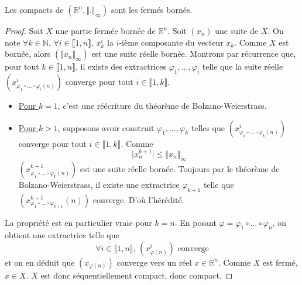 





  \begin{lemma}
    \label{equivalence-des-normes-en-dimension-finie-et-theoreme-de-riesz-1}
    Les compacts de $(\mathbb{R}^n, \Vert . \Vert_\infty)$ sont les fermés bornés.
  \end{lemma}

  \begin{proof}
    Soit $X$ une partie fermée bornée de $\mathbb{R}^n$. Soit $(x_n)$ une suite de $X$. On note $\forall k \in \mathbb{N}$, $\forall i \in \llbracket 1, n \rrbracket$, $x_k^i$ la $i$-ième composante du vecteur $x_k$. Comme $X$ est bornée, alors $(\Vert x_n \Vert_\infty)$ est une suite réelle bornée. Montrons par récurrence que, pour tout $k \in \llbracket 1, n \rrbracket$, il existe des extractrices $\varphi_1, \dots, \varphi_i$ telle que la suite réelle $(x^i_{\varphi_1 \circ \dots \circ \varphi_i (n)})$ converge pour tout $i \in \llbracket 1, k \rrbracket$.
    \begin{itemize}
      \item \uline{Pour $k = 1$}, c'est une réécriture du théorème de Bolzano-Weierstrass.
      \item \uline{Pour $k > 1$}, supposons avoir construit $\varphi_1, \dots, \varphi_k$ telles que $(x^i_{\varphi_1 \circ \dots \circ \varphi_k (n)})$ converge pour tout $i \in \llbracket 1, k \rrbracket$. Comme
      \[ \vert x^{k+1}_n \vert \leq \Vert x_n \Vert_\infty \]
      $(x^{k+1}_{\varphi_1 \circ \dots \circ \varphi_k (n)})$ est une suite réelle bornée. Toujours par le théorème de Bolzano-Weierstrass, il existe une extractrice $\varphi_{k+1}$ telle que $(x^{k+1}_{\varphi_1 \circ \dots \circ \varphi_{k+1}}(n))$ converge. D'où l'hérédité.
    \end{itemize}
    La propriété est en particulier vraie pour $k = n$. En posant $\varphi = \varphi_1 \circ \dots \circ \varphi_n$, on obtient une extractrice telle que
    \[ \forall i \in \llbracket 1, n \rrbracket, \, (x^i_{\varphi(n)}) \text{ converge} \]
    et on en déduit que $(x_{\varphi(n)})$ converge vers un réel $x \in \mathbb{R}^n$. Comme $X$ est fermé, $x \in X$. $X$ est donc séquentiellement compact, donc compact.
  \end{proof}

